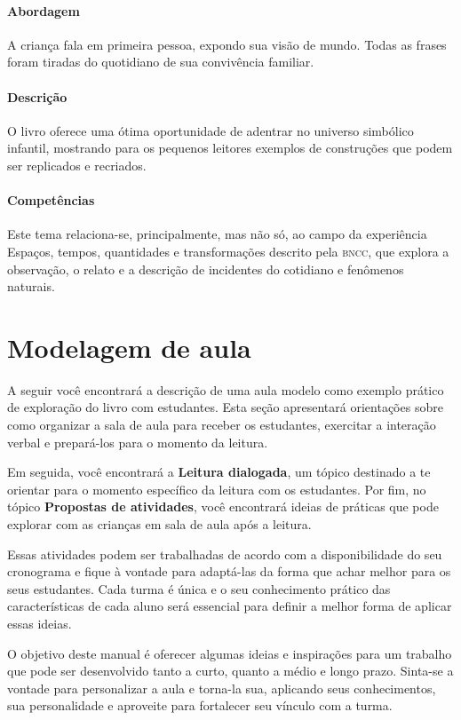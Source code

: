 \documentclass[11pt]{extarticle}
\begin{document}
\paragraph{Abordagem} A criança fala em primeira pessoa, expondo sua visão de mundo.
Todas as frases foram tiradas do quotidiano de sua convivência familiar.

\paragraph{Descrição} O livro oferece uma ótima oportunidade de adentrar no
universo simbólico infantil, mostrando para os pequenos leitores exemplos 
de construções que podem ser replicados e recriados.

\paragraph{Competências} Este tema relaciona-se, principalmente, mas não só, 
ao campo da experiência Espaços, tempos, quantidades e transformações
descrito pela \textsc{bncc}, que explora a observação, o relato e a descrição 
de incidentes do cotidiano e fenômenos naturais.


\section{Modelagem de aula}
A seguir você encontrará a descrição de uma aula modelo como exemplo 
prático de exploração do livro com estudantes. Esta seção apresentará 
orientações sobre como organizar a sala de aula para receber os 
estudantes, exercitar a interação verbal e prepará-los para o 
momento da leitura.

Em seguida, você encontrará a \textbf{Leitura dialogada}, um 
tópico destinado a te orientar para o momento específico da 
leitura com os estudantes. Por fim, no tópico 
\textbf{Propostas de atividades}, você encontrará ideias 
de práticas que pode explorar com as crianças em sala de 
aula após a leitura. 

Essas atividades podem ser trabalhadas de acordo com a 
disponibilidade do seu cronograma e fique à vontade para adaptá-las 
da forma que achar melhor para os seus estudantes. Cada turma é única 
e o seu conhecimento prático das características de cada aluno será 
essencial para definir a melhor forma de aplicar essas ideias. 

O objetivo deste manual é oferecer algumas ideias 
e inspirações para um trabalho que pode ser desenvolvido tanto 
a curto, quanto a médio e longo prazo. Sinta-se a vontade para 
personalizar a aula e torna-la sua, aplicando seus conhecimentos, sua 
personalidade e aproveite para fortalecer 
seu vínculo com a turma.
\end{document}
